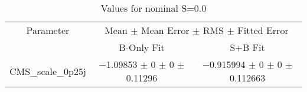 \begin{table}
\centering
\caption{Values for nominal S=0.0}
\begin{tabular}{ccc}
\toprule
Parameter & \multicolumn{2}{c}{Mean $\pm$ Mean Error $\pm$ RMS $\pm$ Fitted Error}\\
 & B-Only Fit & S+B Fit\\
\midrule
CMS\_scale\_0p25j & \num{-1.09853} $\pm$ \num{0} $\pm$ \num{0} $\pm$ \num{0.11296} & \num{-0.915994} $\pm$ \num{0} $\pm$ \num{0} $\pm$ \num{0.112663}\\
\bottomrule
\end{tabular}
\end{table}